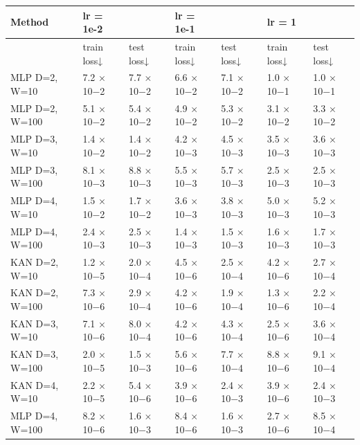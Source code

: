 \begin{tabular}{lllllll}
\toprule
Method & lr = 1e-2 &  & lr = 1e-1 &  & lr = 1 &  \\
\midrule
 & train loss↓ & test loss↓ & train loss↓ & test loss↓ & train loss↓ & test loss↓ \\
MLP D=2, W=10 & 7.2 × 10−2 & 7.7 × 10−2 & 6.6 × 10−2 & 7.1 × 10−2 & 1.0 × 10−1 & 1.0 × 10−1 \\
MLP D=2, W=100 & 5.1 × 10−2 & 5.4 × 10−2 & 4.9 × 10−2 & 5.3 × 10−2 & 3.1 × 10−2 & 3.3 × 10−2 \\
MLP D=3, W=10 & 1.4 × 10−2 & 1.4 × 10−2 & 4.2 × 10−3 & 4.5 × 10−3 & 3.5 × 10−3 & 3.6 × 10−3 \\
MLP D=3, W=100 & 8.1 × 10−3 & 8.8 × 10−3 & 5.5 × 10−3 & 5.7 × 10−3 & 2.5 × 10−3 & 2.5 × 10−3 \\
MLP D=4, W=10 & 1.5 × 10−2 & 1.7 × 10−2 & 3.6 × 10−3 & 3.8 × 10−3 & 5.0 × 10−3 & 5.2 × 10−3 \\
MLP D=4, W=100 & 2.4 × 10−3 & 2.5 × 10−3 & 1.4 × 10−3 & 1.5 × 10−3 & 1.6 × 10−3 & 1.7 × 10−3 \\
KAN D=2, W=10 & 1.2 × 10−5 & 2.0 × 10−4 & 4.5 × 10−6 & 2.5 × 10−4 & 4.2 × 10−6 & 2.7 × 10−4 \\
KAN D=2, W=100 & 7.3 × 10−6 & 2.9 × 10−4 & 4.2 × 10−6 & 1.9 × 10−4 & 1.3 × 10−6 & 2.2 × 10−4 \\
KAN D=3, W=10 & 7.1 × 10−6 & 8.0 × 10−4 & 4.2 × 10−6 & 4.3 × 10−4 & 2.5 × 10−6 & 3.6 × 10−4 \\
KAN D=3, W=100 & 2.0 × 10−5 & 1.5 × 10−3 & 5.6 × 10−6 & 7.7 × 10−4 & 8.8 × 10−6 & 9.1 × 10−4 \\
KAN D=4, W=10 & 2.2 × 10−5 & 5.4 × 10−6 & 3.9 × 10−6 & 2.4 × 10−3 & 3.9 × 10−6 & 2.4 × 10−3 \\
MLP D=4, W=100 & 8.2 × 10−6 & 1.6 × 10−3 & 8.4 × 10−6 & 1.6 × 10−3 & 2.7 × 10−6 & 8.5 × 10−4 \\
\bottomrule
\end{tabular}
